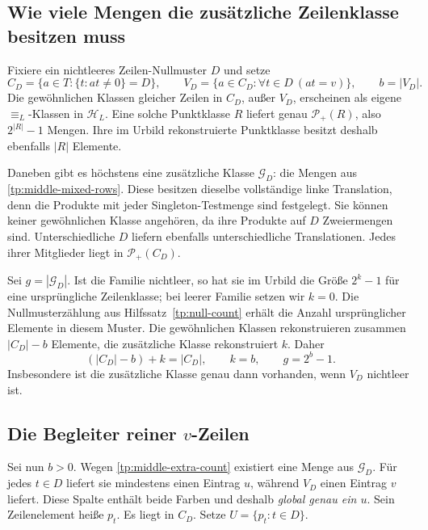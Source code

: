 \documentclass[a4paper,11pt]{article}
\newcommand{\Pp}[1]{\mathcal P_+(#1)}
\newcommand{\HL}{\mathcal H_L}
\theoremstyle{remark}
\begin{document}
\subsection{Wie viele Mengen die zusätzliche Zeilenklasse besitzen muss}

Fixiere ein nichtleeres Zeilen-Nullmuster \(D\) und setze
\[
 C_D=\{a\in T:\{t:at\ne0\}=D\},\qquad
 V_D=\{a\in C_D:\forall t\in D\ (at=v)\},\qquad b=|V_D|.
\]
Die gewöhnlichen Klassen gleicher Zeilen in \(C_D\), außer
\(V_D\), erscheinen als eigene \(\equiv_L\)-Klassen in
\(\HL\). Eine solche Punktklasse \(R\) liefert genau
\(\Pp{R}\), also \(2^{|R|}-1\) Mengen. Ihre im Urbild
rekonstruierte Punktklasse besitzt deshalb ebenfalls \(|R|\)
Elemente.

Daneben gibt es höchstens eine zusätzliche Klasse \(\mathcal G_D\):
die Mengen aus \eqref{tp:middle-mixed-rows}. Diese besitzen dieselbe
vollständige linke Translation, denn die Produkte mit jeder
Singleton-Testmenge sind festgelegt. Sie können keiner gewöhnlichen
Klasse angehören, da ihre Produkte auf \(D\) Zweiermengen sind.
Unterschiedliche \(D\) liefern ebenfalls unterschiedliche
Translationen. Jedes ihrer Mitglieder liegt in \(\Pp{C_D}\).

Sei \(g=|\mathcal G_D|\). Ist die Familie nichtleer, so hat sie
im Urbild die Größe \(2^k-1\) für eine ursprüngliche Zeilenklasse;
bei leerer Familie setzen wir \(k=0\). Die Nullmusterzählung aus
Hilfssatz~\ref{tp:null-count} erhält die Anzahl ursprünglicher Elemente
in diesem Muster. Die gewöhnlichen Klassen rekonstruieren zusammen
\(|C_D|-b\) Elemente, die zusätzliche Klasse rekonstruiert \(k\).
Daher
\begin{equation}
 (|C_D|-b)+k=|C_D|,\qquad
 k=b,\qquad g=2^b-1.
 \label{tp:middle-extra-count}
\end{equation}
Insbesondere ist die zusätzliche Klasse genau dann vorhanden,
wenn \(V_D\) nichtleer ist.

\subsection{Die Begleiter reiner \texorpdfstring{\(v\)}{v}-Zeilen}

Sei nun \(b>0\). Wegen \eqref{tp:middle-extra-count} existiert eine
Menge aus \(\mathcal G_D\). Für jedes \(t\in D\) liefert sie
mindestens einen Eintrag \(u\), während \(V_D\) einen Eintrag
\(v\) liefert. Diese Spalte enthält beide Farben und deshalb
\emph{global genau ein \(u\)}. Sein Zeilenelement heiße \(p_t\).
Es liegt in \(C_D\). Setze \(U=\{p_t:t\in D\}\).
\end{document}
